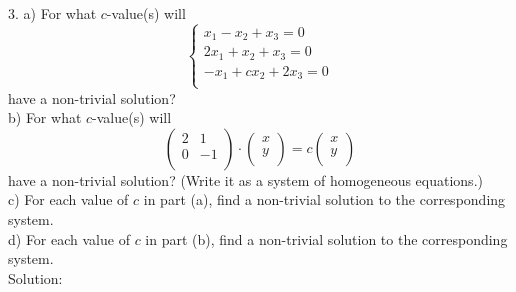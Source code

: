 \documentclass{article}
\begin{document}
3. a) For what $c$-value(s) will
\begin{equation*}
  \begin{cases}
    x_1 - x_2 + x_3 = 0 \\
    2x_1 + x_2 + x_3 = 0 \\
    -x_1 + cx_2 + 2x_3 = 0 \\
  \end{cases}
\end{equation*}
have a non-trivial solution? \\
b) For what $c$-value(s) will 
\begin{equation*}
  \begin{pmatrix}
    2 & 1 \\
    0 & -1 \\
  \end{pmatrix} \cdot
  \begin{pmatrix}
    x \\
    y \\
  \end{pmatrix} = c
  \begin{pmatrix}
    x \\
    y \\
  \end{pmatrix}
\end{equation*}
have a non-trivial solution? (Write it as a system of homogeneous equations.) \\
c) For each value of $c$ in part (a), find a non-trivial solution to the 
corresponding system. \\
d) For each value of $c$ in part (b), find a non-trivial solution to the 
corresponding system. \\

Solution:
\end{document}
